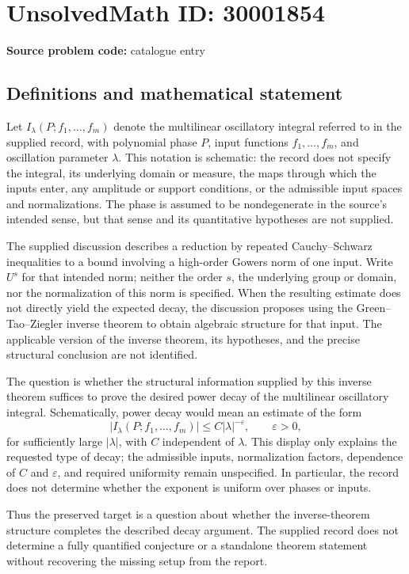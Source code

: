 \documentclass[11pt]{article}
\begin{document}
\section*{UnsolvedMath ID: 30001854}
\textbf{Source problem code:} catalogue entry
\subsection{Definitions and mathematical statement}
Let \(I_\lambda(P;f_1,\ldots,f_m)\) denote the multilinear oscillatory integral referred to in the supplied record, with polynomial phase \(P\), input functions \(f_1,\ldots,f_m\), and oscillation parameter \(\lambda\). This notation is schematic: the record does not specify the integral, its underlying domain or measure, the maps through which the inputs enter, any amplitude or support conditions, or the admissible input spaces and normalizations. The phase is assumed to be nondegenerate in the source's intended sense, but that sense and its quantitative hypotheses are not supplied.

The supplied discussion describes a reduction by repeated Cauchy--Schwarz inequalities to a bound involving a high-order Gowers norm of one input. Write \(U^s\) for that intended norm; neither the order \(s\), the underlying group or domain, nor the normalization of this norm is specified. When the resulting estimate does not directly yield the expected decay, the discussion proposes using the Green--Tao--Ziegler inverse theorem to obtain algebraic structure for that input. The applicable version of the inverse theorem, its hypotheses, and the precise structural conclusion are not identified.

The question is whether the structural information supplied by this inverse theorem suffices to prove the desired power decay of the multilinear oscillatory integral. Schematically, power decay would mean an estimate of the form
\[
\bigl|I_\lambda(P;f_1,\ldots,f_m)\bigr|\leq C|\lambda|^{-\varepsilon},
\qquad \varepsilon>0,
\]
for sufficiently large \(|\lambda|\), with \(C\) independent of \(\lambda\). This display only explains the requested type of decay; the admissible inputs, normalization factors, dependence of \(C\) and \(\varepsilon\), and required uniformity remain unspecified. In particular, the record does not determine whether the exponent is uniform over phases or inputs.

Thus the preserved target is a question about whether the inverse-theorem structure completes the described decay argument. The supplied record does not determine a fully quantified conjecture or a standalone theorem statement without recovering the missing setup from the report.
\end{document}
